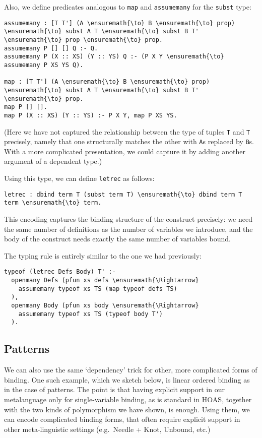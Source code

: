 Also, we define predicates analogous to \texttt{map} and
\texttt{assumemany} for the \texttt{subst} type:

\begin{verbatim}
assumemany : [T T'] (A \ensuremath{\to} B \ensuremath{\to} prop) \ensuremath{\to} subst A T \ensuremath{\to} subst B T' \ensuremath{\to} prop \ensuremath{\to} prop.
assumemany P [] [] Q :- Q.
assumemany P (X :: XS) (Y :: YS) Q :- (P X Y \ensuremath{\to} assumemany P XS YS Q).

map : [T T'] (A \ensuremath{\to} B \ensuremath{\to} prop) \ensuremath{\to} subst A T \ensuremath{\to} subst B T' \ensuremath{\to} prop.
map P [] [].
map P (X :: XS) (Y :: YS) :- P X Y, map P XS YS.
\end{verbatim}

(Here we have not captured the relationship between the type of tuples
\texttt{T} and \texttt{T\textquotesingle{}} precisely, namely that one
structurally matches the other with \texttt{A}s replaced by \texttt{B}s.
With a more complicated presentation, we could capture it by adding
another argument of a dependent type.)

Using this type, we can define \texttt{letrec} as follows:

\begin{verbatim}
letrec : dbind term T (subst term T) \ensuremath{\to} dbind term T term \ensuremath{\to} term.
\end{verbatim}

This encoding captures the binding structure of the construct precisely:
we need the same number of definitions as the number of variables we
introduce, and the body of the construct needs exactly the same number
of variables bound.

The typing rule is entirely similar to the one we had previously:

\begin{verbatim}
typeof (letrec Defs Body) T' :-
  openmany Defs (pfun xs defs \ensuremath{\Rightarrow}
    assumemany typeof xs TS (map typeof defs TS)
  ),
  openmany Body (pfun xs body \ensuremath{\Rightarrow}
    assumemany typeof xs TS (typeof body T')
  ).
\end{verbatim}

\subsection{Patterns}\label{patterns}

We can also use the same `dependency' trick for other, more complicated
forms of binding. One such example, which we sketch below, is linear
ordered binding as in the case of patterns. The point is that having
explicit support in our metalanguage only for single-variable binding,
as is standard in HOAS, together with the two kinds of polymorphism we
have shown, is enough. Using them, we can encode complicated binding
forms, that often require explicit support in other meta-linguistic
settings (e.g.~Needle + Knot, Unbound, etc.)

